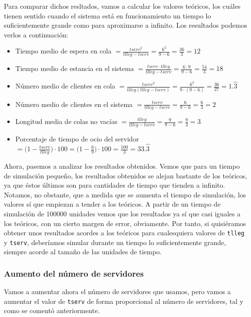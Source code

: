 \documentclass[11pt,a4paper]{article}
\begin{document}
Para comparar dichos resltados, vamos a calcular los valores teóricos, los
cuáles tienen sentido cuando el sistema está en funcionamiento un tiempo lo
suficientemente grande como para aproximarse a infinito. Los resultados
podemos verlos a continuación:

\begin{itemize}[label=\textbullet]
	\item Tiempo medio de espera en cola
	$= \frac{tserv^2}{tlleg-tserv} = \frac{6^2}{9-6} = \frac{36}{3} = 12$
	\item Tiempo medio de estancia en el sistema
	$= \frac{tserv \cdot tlleg}{tlleg-tserv} = \frac{6 \cdot 9}{9-6} = \frac{54}{3} = 18$
	\item Número medio de clientes en cola
	$= \frac{tserv^2}{tlleg (tlleg-tserv)} = \frac{6^2}{9\cdot (9-6)} = \frac{36}{27} = 1.\wideparen{3}$
	\item Número medio de clientes en el sistema
	$= \frac{tserv}{tlleg-tserv} = \frac{6}{9-6} = \frac{6}{3} = 2$
	\item Longitud media de colas no vacías
	$= \frac{tlleg}{tlleg-tserv} = \frac{9}{9-6} = \frac{9}{3} = 3$
	\item Porcentaje de tiempo de ocio del servidor
	$= \big(1 - \frac{tserv}{tlleg}\big) \cdot 100 = \big(1 - \frac{6}{9}\big) \cdot 100 = \frac{100}{3} = 33.\wideparen{3}$
\end{itemize}

Ahora, pasemos a analizar los resultados obtenidos. Vemos que para un tiempo de
simulación pequeño, los resultados obtenidos se alejan bastante de los teóricos,
ya que éstos últimos son para cantidades de tiempo que tienden a infinito. Notamos,
no obstante, que a medida que se aumenta el tiempo de simulación, los valores sí
que empiezan a tender a los teóricos. A partir de un tiempo de simulación de 100000
unidades vemos que los resultados ya sí que casi iguales a los teóricos, con un cierto margen
de error, obviamente. Por tanto, si quisiéramos obtener unos resultados acordes
a los teóricos para cualesquiera valores de \texttt{tlleg} y \texttt{tserv}, deberíamos
simular durante un tiempo lo suficientemente grande, siempre acorde al tamaño
de las unidades de tiempo.

\subsubsection{Aumento del número de servidores}

Vamos a aumentar ahora el número de servidores que usamos, pero vamos a aumentar
el valor de \texttt{tserv} de forma proporcional al número de servidores, tal
y como se comentó anteriormente.
\end{document}
